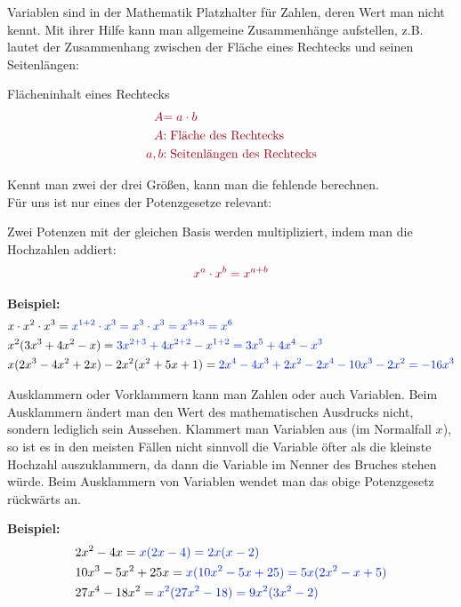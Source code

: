 Variablen sind in der Mathematik Platzhalter für Zahlen, deren Wert man nicht kennt. Mit ihrer Hilfe kann man allgemeine Zusammenhänge aufstellen, z.B. lautet der Zusammenhang zwischen der Fläche eines Rechtecks und seinen Seitenlängen:
\begin{tcolorbox}
	Flächeninhalt eines Rechtecks
	\begin{align*}
		\textcolor{loestc}{A}&\textcolor{loestc}{=a\cdot b}\\
		\textcolor{loestc}{A}&\textcolor{loestc}{: \text{Fläche des Rechtecks}}\\
		\textcolor{loestc}{a, b}&\textcolor{loestc}{: \text{Seitenlängen des Rechtecks}}
	\end{align*}
\end{tcolorbox}
Kennt man zwei der drei Größen, kann man die fehlende berechnen.\\
Für uns ist nur eines der Potenzgesetze relevant:
\begin{tcolorbox}
	Zwei Potenzen mit der gleichen Basis werden multipliziert, indem man die Hochzahlen addiert:
	\begin{align*}
		\textcolor{loestc}{x^a\cdot x^b=x^{a+b}}
	\end{align*}
\end{tcolorbox}

\textbf{Beispiel:}
\begin{align*}
	&x\cdot x^2 \cdot x^3=\textcolor{loes}{x^{1+2}\cdot x^3=x^3\cdot x^3=x^{3+3}=x^6}\\
	&x^2(3x^3+4x^2-x)=\textcolor{loes}{3x^{2+3}+4x^{2+2}-x^{1+2}=3x^5+4x^4-x^3}\\
	&x(2x^3-4x^2+2x)-2x^2(x^2+5x+1)=\textcolor{loes}{2x^4-4x^3+2x^2-2x^4-10x^3-2x^2=-16x^3}
\end{align*}

Ausklammern oder Vorklammern kann man Zahlen oder auch Variablen. Beim Ausklammern ändert man den Wert des mathematischen Ausdrucks nicht, sondern lediglich sein Aussehen. Klammert man Variablen aus (im Normalfall \(x\)), so ist es in den meisten Fällen nicht sinnvoll die Variable öfter als die kleinste Hochzahl auszuklammern, da dann die Variable im Nenner des Bruches stehen würde. Beim Ausklammern von Variablen wendet man das obige Potenzgesetz rückwärts an.

\textbf{Beispiel:}
\begin{align*}
	&2x^2-4x=\textcolor{loes}{x(2x-4)=2x(x-2)}\\
	&10x^3-5x^2+25x=\textcolor{loes}{x(10x^2-5x+25)=5x(2x^2-x+5)}\\
	&27x^4-18x^2=\textcolor{loes}{x^2(27x^2-18)=9x^2(3x^2-2)}
\end{align*}

